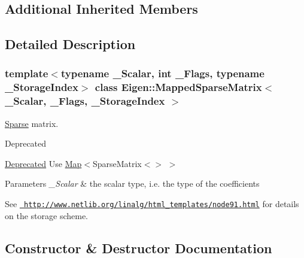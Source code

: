 \subsection*{Additional Inherited Members}


\subsection{Detailed Description}
\subsubsection*{template$<$typename \+\_\+\+Scalar, int \+\_\+\+Flags, typename \+\_\+\+Storage\+Index$>$\newline
class Eigen\+::\+Mapped\+Sparse\+Matrix$<$ \+\_\+\+Scalar, \+\_\+\+Flags, \+\_\+\+Storage\+Index $>$}

\mbox{\hyperlink{struct_eigen_1_1_sparse}{Sparse}} matrix. 

\begin{DoxyRefDesc}{Deprecated}
\item[\mbox{\hyperlink{deprecated__deprecated000037}{Deprecated}}]Use \mbox{\hyperlink{class_eigen_1_1_map}{Map}}$<$Sparse\+Matrix$<$$>$ $>$\end{DoxyRefDesc}

\begin{DoxyParams}{Parameters}
{\em \+\_\+\+Scalar} & the scalar type, i.\+e. the type of the coefficients\\
\hline
\end{DoxyParams}
See \href{http://www.netlib.org/linalg/html_templates/node91.html}{\texttt{ http\+://www.\+netlib.\+org/linalg/html\+\_\+templates/node91.\+html}} for details on the storage scheme. 

\subsection{Constructor \& Destructor Documentation}
\mbox{\label{class_eigen_1_1_mapped_sparse_matrix_a0c36a53853f1659ea59447bcb9a20799}} 
